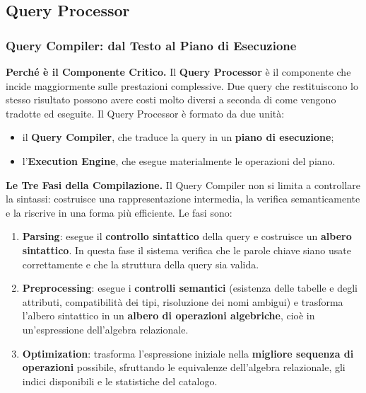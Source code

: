 \documentclass[12pt]{extarticle}
\begin{document}
\subsection{Query Processor}
\subsubsection{Query Compiler: dal Testo al Piano di Esecuzione}

\noindent \textbf{Perché è il Componente Critico.} Il \textbf{Query Processor} è il componente che incide maggiormente sulle prestazioni complessive. Due query che restituiscono lo stesso risultato possono avere costi molto diversi a seconda di come vengono tradotte ed eseguite. Il Query Processor è formato da due unità:
\begin{itemize}
    \item il \textbf{Query Compiler}, che traduce la query in un \textbf{piano di esecuzione};
    \item l'\textbf{Execution Engine}, che esegue materialmente le operazioni del piano.
\end{itemize}

\medskip
\noindent \textbf{Le Tre Fasi della Compilazione.} Il Query Compiler non si limita a controllare la sintassi: costruisce una rappresentazione intermedia, la verifica semanticamente e la riscrive in una forma più efficiente. Le fasi sono:
\begin{enumerate}
    \item \textbf{Parsing}: esegue il \textbf{controllo sintattico} della query e costruisce un \textbf{albero sintattico}. In questa fase il sistema verifica che le parole chiave siano usate correttamente e che la struttura della query sia valida.
    \item \textbf{Preprocessing}: esegue i \textbf{controlli semantici} (esistenza delle tabelle e degli attributi, compatibilità dei tipi, risoluzione dei nomi ambigui) e trasforma l'albero sintattico in un \textbf{albero di operazioni algebriche}, cioè in un'espressione dell'algebra relazionale.
    \item \textbf{Optimization}: trasforma l'espressione iniziale nella \textbf{migliore sequenza di operazioni} possibile, sfruttando le equivalenze dell'algebra relazionale, gli indici disponibili e le statistiche del catalogo.
\end{enumerate}
\end{document}
